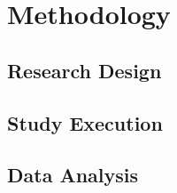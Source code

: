 \section{Methodology} \label{sec:methodology}

\subsection{Research Design} \label{sec:research_design}

\subsection{Study Execution} \label{sec:study_execution}

\subsection{Data Analysis} \label{sec:data_analysis}
